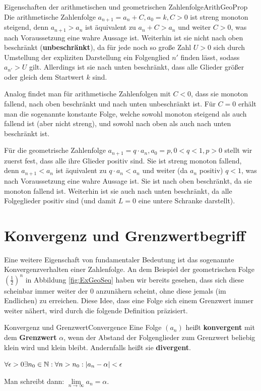 \begin{example}{Eigenschaften der arithmetischen und geometrischen Zahlenfolge}{ArithGeoProp}
	Die arithmetische Zahlenfolge $a_{n+1} = a_n + C, a_0 = k, C > 0$ ist streng monoton steigend, denn $a_{n+1} > a_n$ ist äquivalent zu $a_n + C > a_n$ und weiter $C > 0$, was nach Voraussetzung eine wahre Aussage ist. Weiterhin ist sie nicht nach oben beschränkt (\textbf{unbeschränkt}), da für jede noch so große Zahl $U > 0$ sich durch Umstellung der expliziten Darstellung ein Folgenglied $n'$ finden lässt, sodass $a_{n'} > U$ gilt. Allerdings ist sie nach unten beschränkt, dass alle Glieder größer oder gleich dem Startwert $k$ sind.

	Analog findet man für arithmetische Zahlenfolgen mit $C<0$, dass sie monoton fallend, nach oben beschränkt und nach unten unbeschränkt ist. Für $C=0$ erhält man die sogenannte konstante Folge, welche sowohl monoton steigend als auch fallend ist (aber nicht streng), und sowohl nach oben als auch nach unten beschränkt ist.

	Für die geometrische Zahlenfolge $a_{n+1} = q \cdot a_n, a_0 = p, 0 < q < 1, p > 0$ stellt wir zuerst fest, dass alle ihre Glieder positiv sind. Sie ist streng monoton fallend, denn $a_{n+1} < a_n$ ist äquivalent zu $q \cdot a_n < a_n$ und weiter (da $a_n$ positiv) $q < 1$, was nach Voraussetzung eine wahre Aussage ist. Sie ist nach oben beschränkt, da sie monoton fallend ist. Weiterhin ist sie auch nach unten beschränkt, da alle Folgeglieder positiv sind (und damit $L=0$ eine untere Schranke darstellt).
\end{example}

\section{Konvergenz und Grenzwertbegriff}

Eine weitere Eigenschaft von fundamentaler Bedeutung ist das sogenannte Konvergenzverhalten einer Zahlenfolge. An dem Beispiel der geometrischen Folge $(\frac{1}{2})^n$ in Abbildung \ref{fig:ExGeoSeq} haben wir bereits gesehen, dass sich diese scheinbar immer weiter der $0$ anzunähern scheint, ohne diese jemals (im Endlichen) zu erreichen. Diese Idee, dass eine Folge sich einem Grenzwert immer weiter nähert, wird durch die folgende Definition präzisiert.

\begin{definition}{Konvergenz und Grenzwert}{Convergence}
	Eine Folge $(a_n)$ heißt \textbf{konvergent} mit dem \textbf{Grenzwert} $\alpha$, wenn der Abstand der Folgenglieder zum Grenzwert beliebig klein wird und klein bleibt. Andernfalls heißt sie \textbf{divergent}.

	$\forall \epsilon > 0 \exists n_0\in\mathbb{N}: \forall n > n_0 : |a_n - \alpha| < \epsilon$

	Man schreibt dann: $\lim\limits_{n\to\infty} a_n = \alpha$.
\end{definition}

